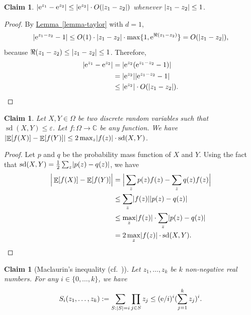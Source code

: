 \documentclass[11pt]{article}
\numberwithin{equation}{section}
\newtheorem{claim}[theorem]{Claim}
\theoremstyle{definition}
\theoremstyle{plain}
\newcommand{\C}{\mathbb C}
\newcommand{\eee}{\mathrm e}
\newcommand{\expref}[2]{\hyperref[#2]{#1~\ref{#2}}}
\def\eps{\varepsilon}
\DeclarePairedDelimiter{\abs}{\lvert}{\rvert}
\DeclareMathOperator*{\E}{\mathbb{E}}                 %
\DeclareMathOperator*{\sd}{sd}             %
\begin{document}
  \begin{claim} \label{claim-exp-close}
    $\abs{\eee^{z_1} - \eee^{z_2}} \le \abs{\eee^{z_2}} \cdot O(\abs{z_1 - z_2})$ whenever $\abs{z_1 - z_2} \le 1$.
  \end{claim}
  \begin{proof}
    By \expref{Lemma}{lemma-taylor} with $d = 1$,
    \[
      \abs{ \eee^{z_1 - z_2} - 1 } \le O(1) \cdot \abs{z_1 - z_2} \cdot \max\{ 1, \eee^{\Re(z_1 - z_2)} \} = O(\abs{z_1 - z_2}),
    \]
    because $\Re(z_1 - z_2) \le \abs{ z_1 - z_2 } \le 1$.
    Therefore,
    \begin{align*}
      \abs{\eee^{z_1} - \eee^{z_2}}
        &= \abs{ \eee^{z_2} (\eee^{z_1 - z_2} - 1) } \\
        &= \abs{ \eee^{z_2} } \abs{ \eee^{z_1 - z_2} - 1 } \\
        &\le \abs{ \eee^{z_2} } \cdot O(\abs{z_1 - z_2}) . \qedhere
    \end{align*}
  \end{proof}

  \begin{claim} \label{claim-sd-of-function}
    Let $X, Y \in \Omega$ be two discrete random variables such that $\sd(X, Y) \le \eps$.
    Let $f\colon \Omega \to \C$ be any function.
    We have $\abs{\E[f(X)] - \E[f(Y)]} \le 2 \max_z \abs{f(z)} \cdot \sd(X, Y)$.
  \end{claim}
  \begin{proof}
    Let $p$ and $q$ be the probability mass function of $X$ and $Y$.
    Using the fact that $\sd(X, Y) = \frac{1}{2} \sum_z \abs{p(z) - q(z)}$, we have
    \begin{align*}
      \Big| \E[f(X)] - \E[f(Y)] \Big|
      &= \Big| \sum_z p(z) f(z) - \sum_z q(z) f(z) \Big| \\
      &\le \sum_z \abs{f(z)} \abs{p(z) - q(z)} \\
      &\le \max_z \abs{f(z)} \cdot \sum_z \abs{p(z) - q(z)} \\
      &= 2 \max_z \abs{f(z)} \cdot \sd(X, Y) . \qedhere
    \end{align*}
  \end{proof}

  \begin{claim}[Maclaurin's inequality (cf.~\cite{Steele04})] \label{claim-maclaurin}
    Let $z_1, \ldots, z_k$ be $k$ non-negative real numbers.
    For any $i \in \{0,
    \ldots, k\}$, we have
    \[ S_i(z_1, \ldots, z_k) := \sum_{S: \abs{S} = i} \prod_{j \in S} z_j \le
    (\eee/i)^i (\sum_{j=1}^k z_j)^i. \]
  \end{claim}
\end{document}

